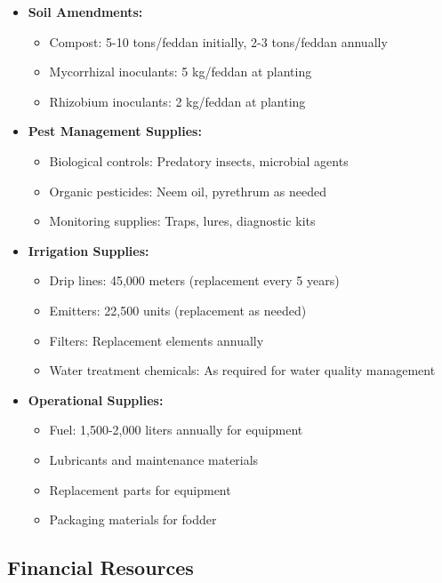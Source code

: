 \begin{itemize}
    \item \textbf{Soil Amendments:}
    \begin{itemize}
        \item Compost: 5-10 tons/feddan initially, 2-3 tons/feddan annually
        \item Mycorrhizal inoculants: 5 kg/feddan at planting
        \item Rhizobium inoculants: 2 kg/feddan at planting
    \end{itemize}
    \item \textbf{Pest Management Supplies:}
    \begin{itemize}
        \item Biological controls: Predatory insects, microbial agents
        \item Organic pesticides: Neem oil, pyrethrum as needed
        \item Monitoring supplies: Traps, lures, diagnostic kits
    \end{itemize}
    \item \textbf{Irrigation Supplies:}
    \begin{itemize}
        \item Drip lines: 45,000 meters (replacement every 5 years)
        \item Emitters: 22,500 units (replacement as needed)
        \item Filters: Replacement elements annually
        \item Water treatment chemicals: As required for water quality management
    \end{itemize}
    \item \textbf{Operational Supplies:}
    \begin{itemize}
        \item Fuel: 1,500-2,000 liters annually for equipment
        \item Lubricants and maintenance materials
        \item Replacement parts for equipment
        \item Packaging materials for fodder
    \end{itemize}
\end{itemize}

\subsection{Financial Resources}

